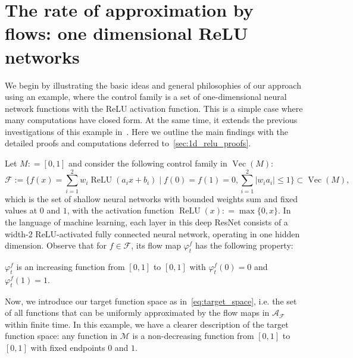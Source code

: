 \documentclass[12pt]{amsart}
\numberwithin{equation}{section}
\theoremstyle{remark}
\newcommand{\ql}[1]{\texttt{\color{cyan} QL: \footnotesize #1}}
\begin{document}
\section{The rate of approximation by flows: one dimensional ReLU networks}
\label{sec:1d_relu}
We begin by illustrating the basic ideas and general philosophies of our approach using an example,
where the control family is a set of one-dimensional neural network functions with the ReLU activation function.
This is a simple case where many computations have closed form.
At the same time, it extends the previous investigations of this example
in~\cite{li2022deep}.
Here we outline the main findings with the detailed proofs and computations deferred to~\cref{sec:1d_relu_proofs}.

Let $M: = [0, 1]$ and consider the following control family in $\operatorname{Vec}(M)$:
\begin{equation}
    \label{eq:1d_relu_family}
    \mathcal F:= \{f(x) =\sum_{i=1}^2 w_i \operatorname{ReLU}(a_i x+b_i)\mid  f(0)=f(1)=0, \sum_{i=1}^2 |w_i a_i| \le 1 \}\subset \operatorname{Vec}(M),
\end{equation}
which is the set of shallow neural networks with bounded weights sum and fixed values at $0$ and $1$, with the activation function $\operatorname{ReLU}(x): = \max\{0, x\}$.
In the language of machine learning, each layer in this deep ResNet
consists of a width-2 ReLU-activated fully connected neural network, operating in one hidden dimension.
Observe that for $f \in \mathcal F$, its flow map $\varphi_t^f$ has the following property:
\begin{center}
$\varphi_t^f$ is an increasing function from $[0, 1]$ to $[0, 1]$ with $\varphi_t^f(0) = 0$ and $\varphi_t^f(1) = 1$.
\end{center}

Now, we introduce our target function space as in~\eqref{eq:target_space}, i.e. the set of all functions that can be uniformly approximated by the flow maps in $\mathcal A_{\mathcal F}$ within finite time.
In this example, we have a clearer description of the target function space: any function in $\mathcal M$ is a non-decreasing function from $[0, 1]$ to $[0, 1]$ with fixed endpoints $0$ and $1$.

\end{document}
